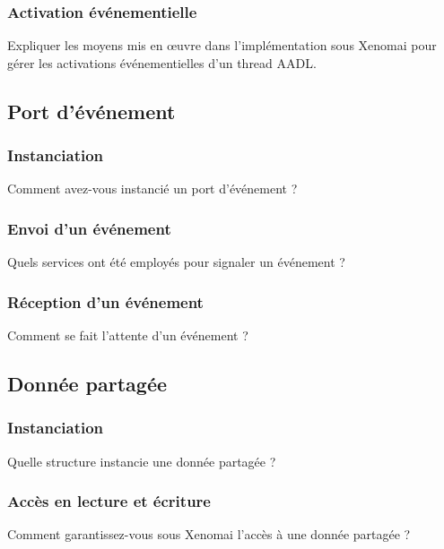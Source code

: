 \documentclass[11pt, a4paper]{paper}
\begin{document}
\subsubsection{Activation événementielle}
 {\color{blue} Expliquer les moyens mis en {\oe}uvre dans l'implémentation sous Xenomai pour gérer les activations événementielles d'un thread AADL.}

 
\subsection{Port d’événement}

\subsubsection{Instanciation}
 {\color{blue} Comment avez-vous instancié un port d'événement ?}\\
 
\subsubsection{Envoi d’un événement}
 {\color{blue} Quels services ont été employés pour signaler un événement ?}

\subsubsection{Réception d’un événement}
 {\color{blue} Comment se fait l'attente d'un événement ?}

\subsection{Donnée partagée}

\subsubsection{Instanciation}
 {\color{blue} Quelle structure instancie une donnée partagée ?}

\subsubsection{Accès en lecture et écriture}
 {\color{blue} Comment garantissez-vous sous Xenomai l'accès à une donnée partagée ?}
\end{document}
